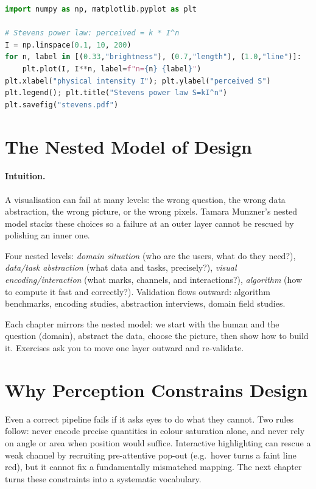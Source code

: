 \begin{lstlisting}[language=Python, caption={Pre-attentive intuition and Stevens law sketch.}, label={lst:stevens}]
import numpy as np, matplotlib.pyplot as plt

# Stevens power law: perceived = k * I^n
I = np.linspace(0.1, 10, 200)
for n, label in [(0.33,"brightness"), (0.7,"length"), (1.0,"line")]:
    plt.plot(I, I**n, label=f"n={n} {label}")
plt.xlabel("physical intensity I"); plt.ylabel("perceived S")
plt.legend(); plt.title("Stevens power law S=kI^n")
plt.savefig("stevens.pdf")
\end{lstlisting}

\section{The Nested Model of Design}
\label{sec:nested}
\paragraph{Intuition.} A visualisation can fail at many levels: the wrong question, the wrong data abstraction, the wrong picture, or the wrong pixels. Tamara Munzner's nested model stacks these choices so a failure at an outer layer cannot be rescued by polishing an inner one.

Four nested levels: \emph{domain situation} (who are the users, what do they need?), \emph{data/task abstraction} (what data and tasks, precisely?), \emph{visual encoding/interaction} (what marks, channels, and interactions?), \emph{algorithm} (how to compute it fast and correctly?). Validation flows outward: algorithm benchmarks, encoding studies, abstraction interviews, domain field studies.

\begin{remark}\label{rem:nested-flow}
Each chapter mirrors the nested model: we start with the human and the question (domain), abstract the data, choose the picture, then show how to build it. Exercises ask you to move one layer outward and re-validate.
\end{remark}

\section{Why Perception Constrains Design}
\label{sec:perception-design}
Even a correct pipeline fails if it asks eyes to do what they cannot. Two rules follow: never encode precise quantities in colour saturation alone, and never rely on angle or area when position would suffice. Interactive highlighting can rescue a weak channel by recruiting pre-attentive pop-out (e.g.\ hover turns a faint line red), but it cannot fix a fundamentally mismatched mapping. The next chapter turns these constraints into a systematic vocabulary.

